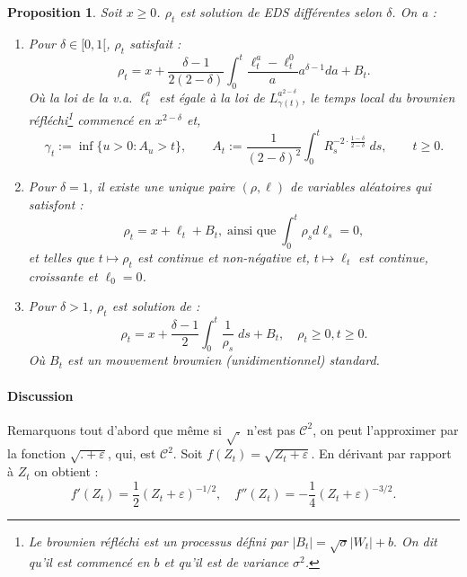 \documentclass[openany]{book}
\newcommand{\1}{\mathbbm{1}}
\theoremstyle{thmfont}
\theoremstyle{deffont}
\theoremstyle{thmfont}
\newtheorem{prop}[prop]{Proposition}
\theoremstyle{deffont}
\begin{document}
\begin{prop} Soit $x \geq 0$. $\rho_t$ est solution de EDS différentes selon $\delta$. On a :
  \begin{enumerate}
    \item Pour $\delta \in [0,1[$, $\rho_t$ satisfait :
     \begin{equation}
       \rho_t = x + \dfrac{\delta-1}{2(2-\delta)}\int_0^t \dfrac{\ell_t^a- \ell_t^0}{a}a^{\delta-1} da + B_t.
       \label{eq:EDSBessel3}
     \end{equation}
     Où la loi de la v.a. $\ell_t^a$ est égale à la loi de $L_{\gamma(t)}^{a^{2-\delta}}$, le temps local du brownien réfléchi\footnote{Le brownien réfléchi est un processus défini par $|B_t| = \sqrt{\sigma}|W_t| + b.$ On dit qu'il est commencé en $b$ et qu'il est de variance $\sigma^2$.} commencé en $x^{2-\delta}$ et,
     $$\gamma_t := \inf\{u > 0 : A_u > t\}, \qquad
     A_t := \frac{1}{(2 - \delta)^2} \int_0^t R_s^{-2 \cdot \frac{1 - \delta}{2 - \delta}} \; ds, \qquad t \geq 0.$$
   \item Pour $\delta =1$, il existe une unique paire $(\rho, \ell)$ de variables aléatoires qui satisfont :
     \begin{equation}
       \rho_t = x + \ell_t + B_t, \;\text{ainsi que}\; \int_0^t \rho_s d\ell_s = 0,
       \label{eq:EDSBessel2}
     \end{equation}
     et telles que $t\mapsto \rho_t$ est continue et non-négative et, $t \mapsto \ell_t$ est continue, croissante et $\ell_0 = 0$.\\
   \item Pour $\delta > 1$, $\rho_t$ est solution de :
     \begin{equation}
       \rho_t = x + \dfrac{\delta-1}{2}\int_0^t \dfrac{1}{\rho_s} \; ds + B_t, \quad \rho_t \geq 0, t \geq 0.
       \label{eq:EDSBessel1}
     \end{equation}
     Où $B_t$ est un mouvement brownien (unidimentionnel) standard.\\
\end{enumerate}
\end{prop}

\paragraph{Discussion}Remarquons tout d'abord que même si $\sqrt{.}$ n'est pas $\mathcal C^2$, on peut l'approximer par la fonction $\sqrt{.+\varepsilon}$, qui, est $\mathcal C^2$. Soit $f(Z_t) = \sqrt{Z_t + \varepsilon}$. En dérivant par rapport à $Z_t$ on obtient : $$f'(Z_t) = \dfrac{1}{2} (Z_t + \varepsilon)^{-1/2},\quad f''(Z_t) = -\dfrac{1}{4} (Z_t + \varepsilon)^{-3/2}.$$ 
\end{document}
